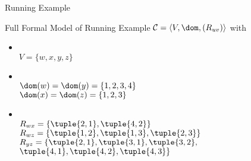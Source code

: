 \begin{frame}{Running Example}
  \begin{exampleblock}{Full Formal Model of Running Example}
    $\mathcal{C} = \langle V, \dom, (R_{uv})\rangle$ with
    \begin{itemize}
      \item {}\\
        $V = \{w,x,y,z\}$
      \item {}\\
        $\dom(w) = \dom(y) = \{1,2,3,4\}$\\
        $\dom(x) = \dom(z) = \{1,2,3\}$
      \item {}\\
        $R_{wx} = \{\tuple{2,1}, \tuple{4,2}\}$\\
        $R_{wz} = \{\tuple{1,2}, \tuple{1,3}, \tuple{2,3}\}$\\
        $R_{yz} = \{\tuple{2,1}, \tuple{3,1}, \tuple{3,2},$\\
        $\tuple{4,1}, \tuple{4,2}, \tuple{4,3}\}$
    \end{itemize}
  \end{exampleblock}
\end{frame}

\iftrue %


